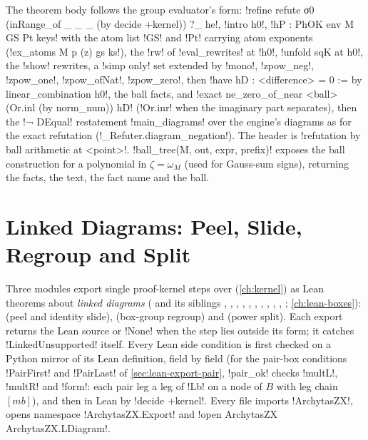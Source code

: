 {{{The theorem body follows the group evaluator's form:
\lexlean!refine refute σ0 (inRange_of _ _ _ (by decide +kernel)) ?_ he!, \lexlean!intro h0!,
\lexlean!hP : PhOK env M GS Pt keys! with the atom list \lexlean!GS! and \lexlean!Pt! carrying atom
exponents (\lexlean!ex_atoms M p (z) gs ks!), the \lexlean!rw! of \lexpy!eval_rewrites! at \lexlean!h0!,
\lexlean!unfold sqK at h0!, the \lexlean!show! rewrites, a \lexlean!simp only! set extended by
\lexlean!mono!, \lexlean!zpow_neg!, \lexlean!zpow_one!, \lexlean!zpow_ofNat!, \lexlean!zpow_zero!, then
\lexlean!have hD : <difference> = 0 := by linear_combination h0!, the ball facts, and
\lexlean!exact ne_zero_of_near <ball> (Or.inl (by norm_num)) hD! (\lexlean!Or.inr! when the imaginary
part separates), then the \lexlean!¬ DEqual! restatement \lexlean!main_diagrams! over the engine's
diagrams as for the exact refutation (\lexpy!_Refuter.diagram_negation!). The header is
\lexcode!refutation by ball arithmetic at <point>!.
\lexpy!ball_tree(M, out, expr, prefix)! exposes the ball construction for a polynomial in
$\zeta = \omega_M$ (used for Gauss-sum signs), returning the facts, the text, the fact name and
the ball.

\section{Linked Diagrams: Peel, Slide, Regroup and Split}\label{sec:lean-export-linked}

Three modules export single proof-kernel steps over \bboxes (\cref{ch:kernel}) as Lean
theorems about \emph{linked diagrams} ( and its siblings
, , ,
, , ,
, , ,
, ; \cref{ch:lean-boxes}):
 (peel and identity slide),
 (box-group regroup) and
 (power split). Each export returns the Lean source or
\lexpy!None! when the step lies outside its form; it catches \lexpy!LinkedUnsupported! itself.
Every Lean side condition is first checked on a Python mirror of its Lean definition, field
by field (for the pair-box conditions \lexlean!PairFirst! and \lexlean!PairLast! of
\cref{sec:lean-export-pair}, \lexpy!pair_ok! checks \lexlean!multL!, \lexlean!multR! and
\lexlean!form!: each pair leg a leg of \lexlean!Lb! on a node of $B$ with leg chain
$[\mathit{mb}]$), and then in Lean by \lexlean!decide +kernel!. Every file
imports \lexlean!ArchytasZX!, opens namespace \lexlean!ArchytasZX.Export! and
\lexlean!open ArchytasZX ArchytasZX.LDiagram!.

}}}

